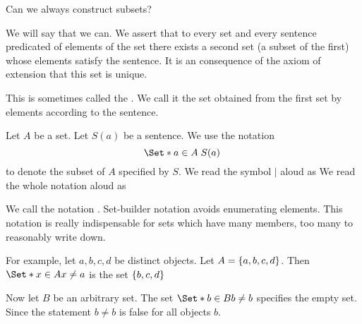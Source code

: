 
\sbasic







\sstart
{}


Can we always construct
subsets?


We will say that we can.
We assert that to
every set and every sentence
predicated of elements of the
set there exists a second
set (a subset of the first)
whose elements satisfy
the sentence.
It is an consequence of the axiom
of extension that this set is unique.

This is sometimes called
the .
We call it the set obtained
from the first set by
 elements
according to the sentence.


Let $A$ be a set.
Let $S(a)$ be a sentence.
We use the notation
\[
  \Set*{a \in A}{\;S(a)\;}
\]
to denote the subset of $A$
specified by $S$.
We read the symbol $\mid$ aloud as
We read the whole notation aloud as

We call the notation
.
Set-builder notation avoids enumerating
elements.
This notation is really indispensable for
sets which have many members, too many
to reasonably write down.


For example, let $a, b, c, d$
be distinct objects.
Let $A = \{a, b, c, d\}$.
Then
$\Set*{x \in A}{x \neq a}$
is the set $\{b, c, d\}$

Now let $B$ be an arbitrary
set.
The set $\Set*{b \in B}{b \neq b}$
specifies the empty set.
Since the statement $b \neq b$ is
false for all objects $b$.

\strats
